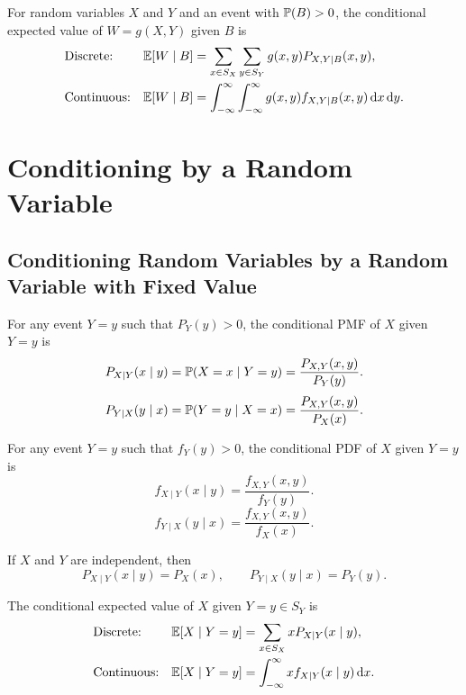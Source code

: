 \begin{definition}
    For random variables $X$ and $Y$ and an event with $\P{B}>0$, the conditional expected value of $W=g(X,Y)$ given $B$ is
    \begin{align*}
        &\text{Discrete:}& \E{W\mid B}&=\sum_{x\in S_X}\sum_{y\in S_Y}g(x,y)P_{X,Y\mid B}(x,y), \\
        &\text{Continuous:}& \E{W\mid B}&=\int_{-\infty}^{\infty}\int_{-\infty}^{\infty}g(x,y)f_{X,Y\mid B}(x,y)\diff x\diff y.
    \end{align*}
\end{definition}

\section{Conditioning by a Random Variable}
\subsection{Conditioning Random Variables by a Random Variable with Fixed Value}
\begin{definition}
    For any event $Y=y$ such that $P_Y(y)>0$, the conditional \textnormal{PMF} of $X$ given $Y=y$ is
    \[P_{X\mid Y}(x\mid y)=\condP{X=x}{Y=y}=\frac{P_{X,Y}(x,y)}{P_Y(y)}.\]
    \[P_{Y\mid X}(y\mid x)=\condP{Y=y}{X=x}=\frac{P_{X,Y}(x,y)}{P_X(x)}.\]
\end{definition}

\begin{definition}
    \label{def:conditional_pdf}
    For any event $Y=y$ such that $f_Y(y)>0$, the conditional \textnormal{PDF} of $X$ given $Y=y$ is
    \[f_{X\mid Y}(x\mid y)=\frac{f_{X,Y}(x,y)}{f_Y(y)}.\]
    \[f_{Y\mid X}(y\mid x)=\frac{f_{X,Y}(x,y)}{f_X(x)}.\]
\end{definition}

\begin{theorem}
    If $X$ and $Y$ are independent, then
    \[P_{X\mid Y}(x\mid y)=P_X(x), \qquad P_{Y\mid X}(y\mid x)=P_Y(y).\]
\end{theorem}

\begin{definition}
    \label{def:conditional_expected_value}
    The conditional expected value of $X$ given $Y=y\in S_Y$ is
    \begin{align*}
        &\text{Discrete:}& \E{X\mid Y=y}&=\sum_{x\in S_X}xP_{X\mid Y}(x\mid y), \\
        &\text{Continuous:}& \E{X\mid Y=y}&=\int_{-\infty}^{\infty}xf_{X\mid Y}(x\mid y)\diff x.
    \end{align*}
\end{definition}

